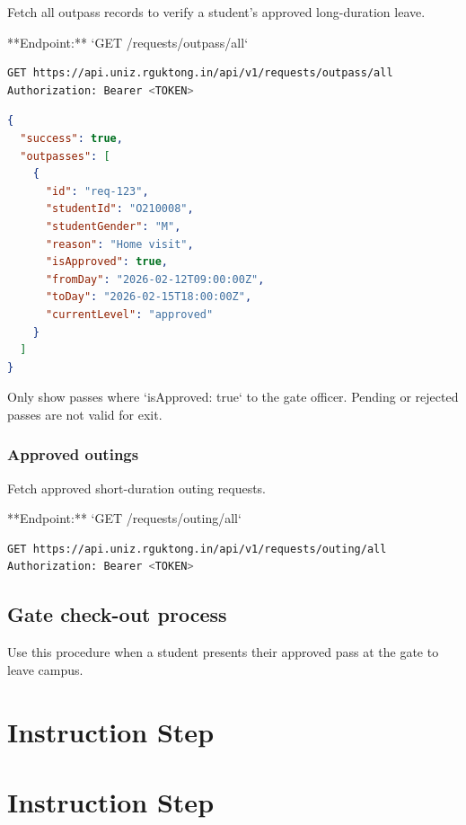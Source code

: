 Fetch all outpass records to verify a student's approved long-duration leave.

**Endpoint:** `GET /requests/outpass/all`

\begin{lstlisting}[language=bash]
GET https://api.uniz.rguktong.in/api/v1/requests/outpass/all
Authorization: Bearer <TOKEN>

\end{lstlisting}

\begin{lstlisting}[language=json]
{
  "success": true,
  "outpasses": [
    {
      "id": "req-123",
      "studentId": "O210008",
      "studentGender": "M",
      "reason": "Home visit",
      "isApproved": true,
      "fromDay": "2026-02-12T09:00:00Z",
      "toDay": "2026-02-15T18:00:00Z",
      "currentLevel": "approved"
    }
  ]
}

\end{lstlisting}

Only show passes where `isApproved: true` to the gate officer. Pending or rejected passes are not valid for exit.

\subsubsection{Approved outings}

Fetch approved short-duration outing requests.

**Endpoint:** `GET /requests/outing/all`

\begin{lstlisting}[language=bash]
GET https://api.uniz.rguktong.in/api/v1/requests/outing/all
Authorization: Bearer <TOKEN>

\end{lstlisting}

\subsection{Gate check-out process}

Use this procedure when a student presents their approved pass at the gate to leave campus.


\section{Instruction Step}

  
\section{Instruction Step}

